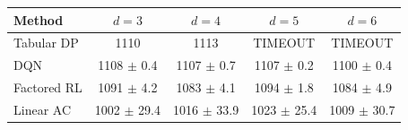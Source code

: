 \begin{tabular}{lcccc}
\toprule
Method & $d=3$ & $d=4$ & $d=5$ & $d=6$ \\
\midrule
Tabular DP & 1110 & 1113 & TIMEOUT & TIMEOUT \\
DQN & 1108 $\pm$ 0.4 & 1107 $\pm$ 0.7 & 1107 $\pm$ 0.2 & 1100 $\pm$ 0.4 \\
Factored RL & 1091 $\pm$ 4.2 & 1083 $\pm$ 4.1 & 1094 $\pm$ 1.8 & 1084 $\pm$ 4.9 \\
Linear AC & 1002 $\pm$ 29.4 & 1016 $\pm$ 33.9 & 1023 $\pm$ 25.4 & 1009 $\pm$ 30.7 \\
\bottomrule
\end{tabular}
